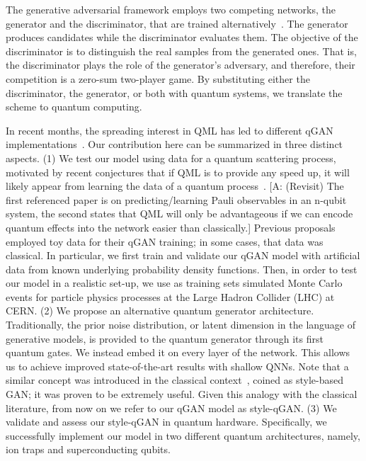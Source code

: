 \documentclass[twocolumn,preprintnumbers,superscriptaddress]{revtex4-2}
\newcommand{\commentAF}[1]{{\color{cyan} {[A: #1]}}}
\begin{document}
The generative adversarial framework employs two competing networks, the generator and the discriminator, that are
trained alternatively~\cite{goodfellow2014generative}. The generator produces candidates
while the discriminator evaluates them. The objective of the discriminator is to
distinguish the real samples from the generated ones. That is, the discriminator
plays the role of the generator's adversary, and therefore, their competition is
a zero-sum two-player game. By substituting either the discriminator, the
generator, or both with quantum systems, we translate the scheme to quantum
computing.

In recent months, the spreading interest in QML has led to different qGAN
implementations~\cite{zoufal2019quantum, zeng2019learning, situ2020quantum, hu2019quantum, benedetti2019adversarial, romero2021variational, niu2021entangling}. Our contribution here can be summarized in three distinct aspects. (1) We test our model using data for a quantum scattering process, motivated by recent conjectures that if QML is to provide any speed up, it will likely appear from learning the data of a quantum process~\cite{huang2021information, kubler2021inductive}. \commentAF{(Revisit) The first referenced paper is on predicting/learning Pauli observables in an n-qubit system, the second states that QML will only be advantageous if we can encode quantum effects into the network easier than classically.} Previous proposals employed toy data for their qGAN training; in some cases, that data was classical. In particular, we first train and validate our qGAN model with artificial data from known underlying probability density functions. Then, in order to test our model in a realistic set-up, we use as training sets simulated Monte Carlo events for particle physics processes at the Large Hadron Collider (LHC) at CERN. (2) We propose an alternative quantum generator architecture. Traditionally, the prior noise distribution, or latent dimension in the language of generative models, is provided to the quantum generator through its first quantum gates. We instead embed it on every layer of the network. This allows us to achieve improved state-of-the-art results with shallow QNNs. Note that a similar concept was introduced in the classical context~\cite{karras2019style}, coined as style-based GAN; it was proven to be extremely useful. Given this analogy with the classical literature, from now on we refer to our qGAN model as style-qGAN. (3) We validate and assess our style-qGAN in quantum hardware. Specifically, we successfully implement our model in two different quantum architectures, namely, ion traps and superconducting qubits.
\end{document}
